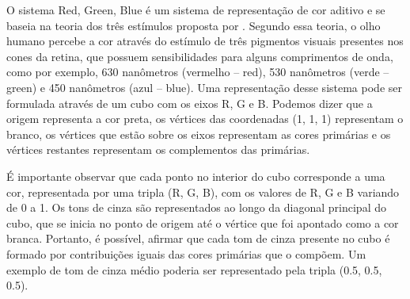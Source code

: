 O sistema Red, Green, Blue é um sistema de representação de cor \cite{Bimbo} aditivo e se baseia na teoria dos três estímulos proposta por \cite{Young}. Segundo essa teoria, o olho humano percebe a cor através do estímulo de três pigmentos visuais presentes nos cones da retina, que possuem sensibilidades para alguns comprimentos de onda, como por exemplo, 630 nanômetros (vermelho – red), 530 nanômetros (verde – green) e 450 nanômetros (azul – blue). Uma representação desse sistema pode ser formulada através de um cubo com os eixos R, G e B. Podemos dizer que a origem representa a cor preta, os vértices das coordenadas (1, 1, 1) representam o branco, os vértices que estão sobre os eixos representam as cores primárias e os vértices restantes representam os complementos das primárias. 

É importante observar que cada ponto no interior do cubo corresponde a uma cor, representada por uma tripla (R, G, B), com os valores de R, G e B variando de 0 a 1. Os tons de cinza são representados ao longo da diagonal principal do cubo, que se inicia no ponto de origem até o vértice que foi apontado como a cor branca. Portanto, é possível, afirmar que cada tom de cinza presente no cubo é formado por contribuições iguais das cores primárias que o compõem. Um exemplo de tom de cinza médio poderia ser representado pela tripla (0.5, 0.5, 0.5).

